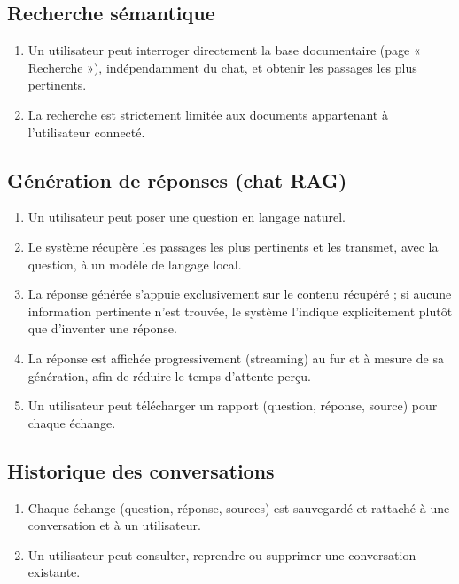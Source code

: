 \documentclass[12pt,a4paper]{report}
\begin{document}
\subsection{Recherche sémantique}
\begin{enumerate}
  \item Un utilisateur peut interroger directement la base documentaire (page « Recherche »), indépendamment du chat, et obtenir les passages les plus pertinents.
  \item La recherche est strictement limitée aux documents appartenant à l'utilisateur connecté.
\end{enumerate}

\subsection{Génération de réponses (chat RAG)}
\begin{enumerate}
  \item Un utilisateur peut poser une question en langage naturel.
  \item Le système récupère les passages les plus pertinents et les transmet, avec la question, à un modèle de langage local.
  \item La réponse générée s'appuie exclusivement sur le contenu récupéré ; si aucune information pertinente n'est trouvée, le système l'indique explicitement plutôt que d'inventer une réponse.
  \item La réponse est affichée progressivement (streaming) au fur et à mesure de sa génération, afin de réduire le temps d'attente perçu.
  \item Un utilisateur peut télécharger un rapport (question, réponse, source) pour chaque échange.
\end{enumerate}

\subsection{Historique des conversations}
\begin{enumerate}
  \item Chaque échange (question, réponse, sources) est sauvegardé et rattaché à une conversation et à un utilisateur.
  \item Un utilisateur peut consulter, reprendre ou supprimer une conversation existante.
\end{enumerate}
\end{document}
